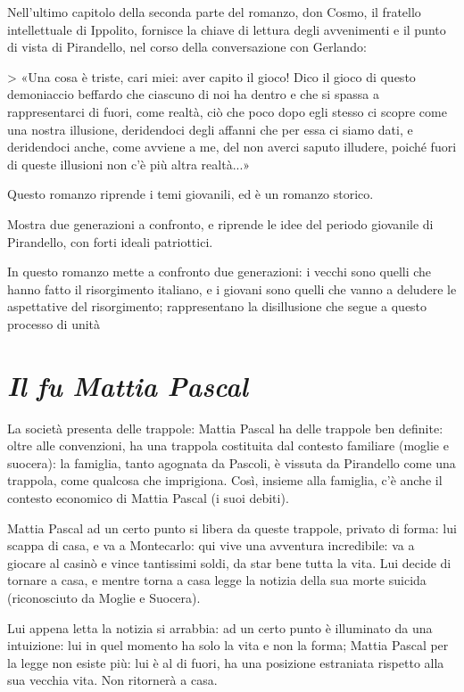 Nell'ultimo capitolo della seconda parte del romanzo, don Cosmo, il fratello intellettuale di Ippolito, fornisce la chiave di lettura degli avvenimenti e il punto di vista di Pirandello, nel corso della conversazione con Gerlando:

> «Una cosa è triste, cari miei: aver capito il gioco! Dico il gioco di questo demoniaccio beffardo che ciascuno di noi ha dentro e che si spassa a rappresentarci di fuori, come realtà, ciò che poco dopo egli stesso ci scopre come una nostra illusione, deridendoci degli affanni che per essa ci siamo dati, e deridendoci anche, come avviene a me, del non averci saputo illudere, poiché fuori di queste illusioni non c'è più altra realtà...»

Questo romanzo riprende i temi giovanili, ed è un romanzo storico.

Mostra due generazioni a confronto, e riprende le idee del periodo giovanile di Pirandello, con forti ideali patriottici.

In questo romanzo mette a confronto due generazioni: i vecchi sono quelli che hanno fatto il risorgimento italiano, e i giovani sono quelli che vanno a deludere le aspettative del risorgimento; rappresentano la disillusione che segue a questo processo di unità


\chapter{\textit{Il fu Mattia Pascal}}

La società presenta delle trappole: Mattia Pascal ha delle trappole ben definite: oltre alle convenzioni, ha una trappola costituita dal contesto familiare (moglie e suocera): la famiglia, tanto agognata da Pascoli, è vissuta da Pirandello come una trappola, come qualcosa che imprigiona.
Così, insieme alla famiglia, c'è anche il contesto economico di Mattia Pascal (i suoi debiti).

Mattia Pascal ad un certo punto si libera da queste trappole, privato di forma: lui scappa di casa, e va a Montecarlo: qui vive una avventura incredibile: va a giocare al casinò e vince tantissimi soldi, da star bene tutta la vita.
Lui decide di tornare a casa, e mentre torna a casa legge la notizia della sua morte suicida (riconosciuto da Moglie e Suocera).

Lui appena letta la notizia si arrabbia: ad un certo punto è illuminato da una intuizione: lui in quel momento ha solo la vita e non la forma; Mattia Pascal per la legge non esiste più: lui è al di fuori, ha una posizione estraniata rispetto alla sua vecchia vita. Non ritornerà a casa.

